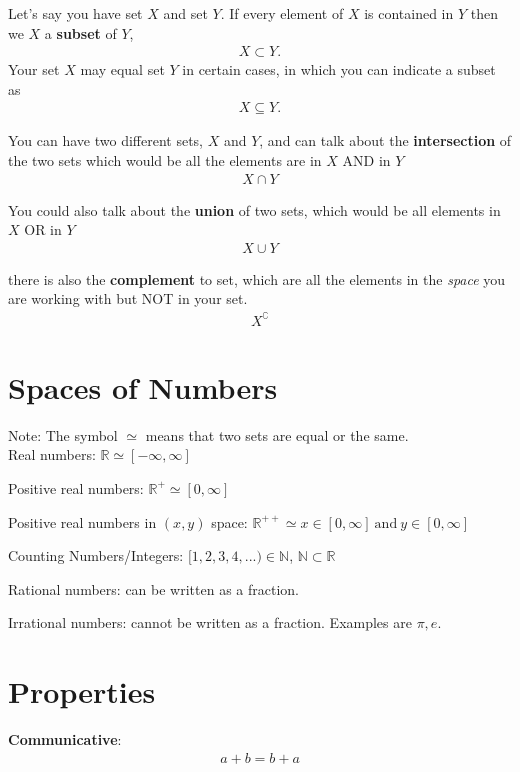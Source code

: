 \documentclass[12pt]{article}
\begin{document}
Let's say you have set $X$ and set $Y$. If every element of $X$ is contained in $Y$ then we $X$ a \textbf{subset} of $Y$, 
\begin{align*}
    X \subset Y.
\end{align*}
Your set $X$ may equal set $Y$ in certain cases, in which you can indicate a subset as 
\begin{align}
    X \subseteq Y.
\end{align}

You can have two different sets, $X$ and $Y$, and can talk about the \textbf{intersection} of the two sets which would be all the elements are in $X$ AND in $Y$ 
\begin{align*}
    X \cap Y
\end{align*}

You could also talk about the \textbf{union} of two sets, which would be all elements in $X$ OR in $Y$
\begin{align*}
    X \cup Y
\end{align*}

there is also the \textbf{complement} to set, which are all the elements in the \textit{space} you are working with but NOT in your set. 
\begin{align*}
    X^\complement
\end{align*}

\section{Spaces of Numbers}

Note: The symbol $\simeq$ means that two sets are equal or the same. \\

Real numbers: $\mathbb{R} \simeq [- \infty, \infty]$

Positive real numbers: $\mathbb{R}^+ \simeq [0, \infty]$

Positive real numbers in $(x,y)$ space: $\mathbb{R}^{++} \simeq  x \in [0, \infty]\ \text{and}\ y \in [0, \infty]$

Counting Numbers/Integers: $[1,2,3,4,...) \in \mathbb{N}$, $\mathbb{N} \subset \mathbb{R}$ 

Rational numbers: can be written as a fraction. 

Irrational numbers: cannot be written as a fraction. Examples are $\pi, e$.

\section{Properties}
\textbf{Communicative}:
\begin{align*}
    a+b = b+ a
\end{align*}
\end{document}
